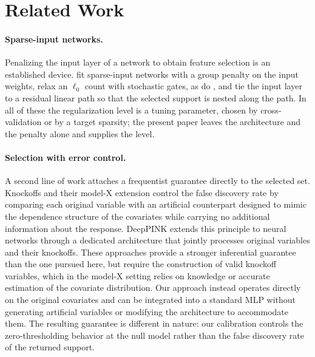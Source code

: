 \documentclass[twoside,11pt]{article}
\begin{document}
\section{Related Work}\label{sec:related}

\paragraph{Sparse-input networks.} Penalizing the input layer of a network to obtain feature selection is an established device. \citet{FengSimon2019} fit sparse-input networks with a group penalty on the input weights, \citet{Louizos2018} relax an $\ell_0$ count with stochastic gates, as do \citet{Yamada2020}, and \citet{LassoNet} tie the input layer to a residual linear path so that the selected support is nested along the path. In all of these the regularization level is a tuning parameter, chosen by cross-validation or by a target sparsity; the present paper leaves the architecture and the penalty alone and supplies the level.

\paragraph{Selection with error control.}
A second line of work attaches a frequentist guarantee directly to the selected set. Knockoffs \citep{BarberCandes2015control} and their model-X extension \citep{Candes2018panning} control the false discovery rate by comparing each original variable with an artificial counterpart designed to mimic the dependence structure of the covariates while carrying no additional
information about the response. DeepPINK \citep{Lu2018deeppink} extends this principle to neural networks through a dedicated architecture that jointly processes original variables and their knockoffs. These approaches provide a stronger inferential guarantee than the one pursued here, but require the
construction of valid knockoff variables, which in the model-X setting relies on knowledge or accurate estimation of the covariate distribution. Our approach instead operates directly on the original covariates and can be integrated into a standard MLP without generating artificial variables or
modifying the architecture to accommodate them. The resulting guarantee is different in nature: our calibration controls the zero-thresholding behavior at the null model rather than the false discovery rate of the returned support.
\end{document}
